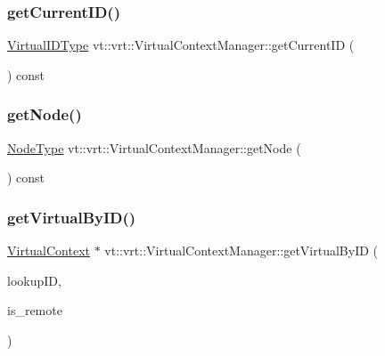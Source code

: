 \subsubsection{\texorpdfstring{get\+Current\+I\+D()}{getCurrentID()}}
{\footnotesize\ttfamily \hyperlink{namespacevt_1_1vrt_a84d0891f52f70728c3fc2172cffb464b}{Virtual\+I\+D\+Type} vt\+::vrt\+::\+Virtual\+Context\+Manager\+::get\+Current\+ID (\begin{DoxyParamCaption}{ }\end{DoxyParamCaption}) const\hspace{0.3cm}{\ttfamily [private]}}

\mbox{\label{structvt_1_1vrt_1_1_virtual_context_manager_ac51ab2c1e35782eeace3c1aaf297214e}} 
\subsubsection{\texorpdfstring{get\+Node()}{getNode()}}
{\footnotesize\ttfamily \hyperlink{namespacevt_a866da9d0efc19c0a1ce79e9e492f47e2}{Node\+Type} vt\+::vrt\+::\+Virtual\+Context\+Manager\+::get\+Node (\begin{DoxyParamCaption}{ }\end{DoxyParamCaption}) const\hspace{0.3cm}{\ttfamily [private]}}

\mbox{\label{structvt_1_1vrt_1_1_virtual_context_manager_a7e586415b9dd42012cc71134d2b5fd30}} 
\subsubsection{\texorpdfstring{get\+Virtual\+By\+I\+D()}{getVirtualByID()}}
{\footnotesize\ttfamily \hyperlink{structvt_1_1vrt_1_1_virtual_context}{Virtual\+Context} $\ast$ vt\+::vrt\+::\+Virtual\+Context\+Manager\+::get\+Virtual\+By\+ID (\begin{DoxyParamCaption}\item[{\hyperlink{namespacevt_1_1vrt_a84d0891f52f70728c3fc2172cffb464b}{Virtual\+I\+D\+Type} const \&}]{lookup\+ID,  }\item[{bool const}]{is\+\_\+remote }\end{DoxyParamCaption})\hspace{0.3cm}{\ttfamily [private]}}

